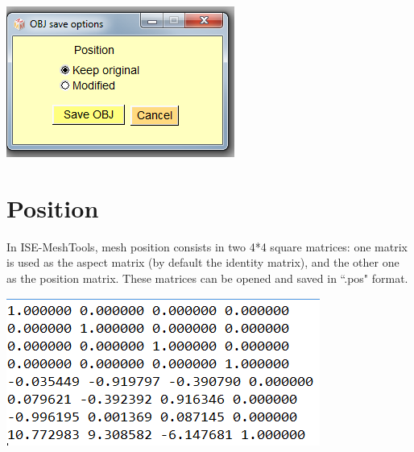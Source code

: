 \begin{minipage}{0.4\textwidth}\centering
  \includegraphics[scale=0.5]{images/File/Save_obj.png}
 \end{minipage} 


\section{Position}
\begin{minipage}{0.4\textwidth}
In ISE-MeshTools, mesh position consists in two
4*4 square matrices: one matrix is used as the
aspect matrix (by default the identity matrix),
and the other one as the position matrix. These
matrices can be opened and saved in ``.pos"
format.
\end{minipage}    
\begin{minipage}{0.5\textwidth}\centering
  \includegraphics[scale=0.5]{images/File/Position_file.png}
 \end{minipage} 



